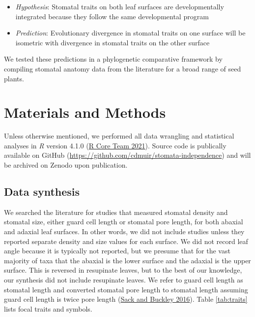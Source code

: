\documentclass[
  10pt,
]{article}
\begin{document}

\begin{itemize}
\item
  \emph{Hypothesis}: Stomatal traits on both leaf surfaces are developmentally integrated because they follow the same developmental program
\item
  \emph{Prediction}: Evolutionary divergence in stomatal traits on one surface will be isometric with divergence in stomatal traits on the other surface
\end{itemize}

We tested these predictions in a phylogenetic comparative framework by compiling stomatal anatomy data from the literature for a broad range of seed plants.

\hypertarget{materials-and-methods}{%
\section{Materials and Methods}\label{materials-and-methods}}

Unless otherwise mentioned, we performed all data wrangling and statistical analyses in \emph{R} version 4.1.0 (\protect\hyperlink{ref-r_core_team_r:_2021}{R Core Team 2021}). Source code is publically available on GitHub (\url{https://github.com/cdmuir/stomata-independence}) and will be archived on Zenodo upon publication.

\hypertarget{data-synthesis}{%
\subsection{Data synthesis}\label{data-synthesis}}

We searched the literature for studies that measured stomatal density and stomatal size, either guard cell length or stomatal pore length, for both abaxial and adaxial leaf surfaces. In other words, we did not include studies unless they reported separate density and size values for each surface. We did not record leaf angle because it is typically not reported, but we presume that for the vast majority of taxa that the abaxial is the lower surface and the adaxial is the upper surface. This is reversed in resupinate leaves, but to the best of our knowledge, our synthesis did not include resupinate leaves. We refer to guard cell length as stomatal length and converted stomatal pore length to stomatal length assuming guard cell length is twice pore length (\protect\hyperlink{ref-sack_developmental_2016}{Sack and Buckley 2016}). Table \ref{tab:traits} lists focal traits and symbols.
\end{document}
